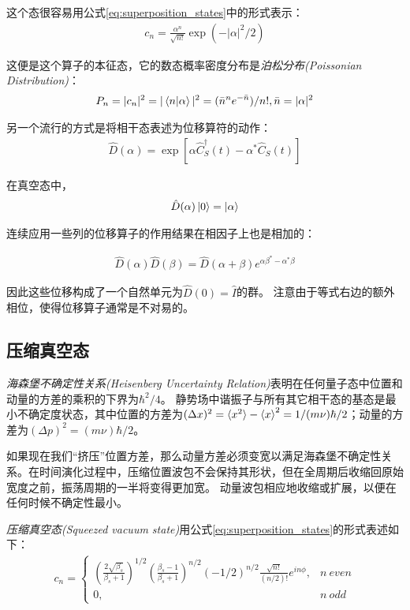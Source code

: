 这个态很容易用公式\eqref{eq:superposition_states}中的形式表示：
\begin{align}
    c_n=\frac{\alpha^n}{\sqrt{n!}}\exp(-|\alpha|^2/2)
\end{align}

这便是这个算子的本征态，它的数态概率密度分布是\emph{泊松分布(Poissonian Distribution)}：
\begin{align}
    P_n=|c_n|^2=|\braket{n|\alpha}|^2=(\bar{n}^n e^{-\bar{n}})/n!, \bar{n}=|\alpha|^2
\end{align}

另一个流行的方式是将相干态表述为位移算符的动作：
\begin{align}
    \hat{D}(\alpha)=\exp\left[\alpha\hat{C}_S^\dagger(t)-\alpha^* \hat{C}_S(t)\right]
\end{align}

在真空态中，
\begin{align}
    \hat{D}(\alpha)\ket{0}=\ket{\alpha}
\end{align}

连续应用一些列的位移算子的作用结果在相因子上也是相加的：

\begin{align}
    \hat{D}(\alpha)\hat{D}(\beta)=\hat{D}(\alpha+\beta)e^{\alpha\beta^*-\alpha^*\beta}
\end{align}

因此这些位移构成了一个自然单元为$\hat{D}(0)=\hat{I}$的群。
注意由于等式右边的额外相位，使得位移算子通常是不对易的。


\subsection[压缩真空态]{压缩真空态}

\emph{海森堡不确定性关系(Heisenberg Uncertainty Relation)}表明在任何量子态中位置和动量的方差的乘积的下界为$\hbar^2/4$。
静势场中谐振子与所有其它相干态的基态是最小不确定度状态，其中位置的方差为$(\Delta x)^2=\braket{x^2}-\braket{x}^2=1/(m\nu)\hbar/2$；动量的方差为$(\Delta p)^2=\left(m\nu\right)\hbar/2$。

如果现在我们“挤压”位置方差，那么动量方差必须变宽以满足海森堡不确定性关系。在时间演化过程中，压缩位置波包不会保持其形状，但在全周期后收缩回原始宽度之前，振荡周期的一半将变得更加宽。
动量波包相应地收缩或扩展，以便在任何时候不确定性最小\cite[]{Wallentowitz_Vogel_2002,Wallentowitz_Vogel_U_2002}。

\emph{压缩真空态(Squeezed vacuum state)}用公式\eqref{eq:superposition_states}的形式表述如下：
\begin{align}
    c_n=\begin{cases}
        \left(\frac{2\sqrt{\beta_s}}{\beta_s+1}\right)^{1/2} \left(\frac{\beta_s-1}{\beta_s+1}\right)^{n/2}(-1/2)^{n/2}\frac{\sqrt{n!}}{(n/2)!}e^{i n \phi}, &n\ even\\
        0, &n\ odd
    \end{cases}
\end{align}

